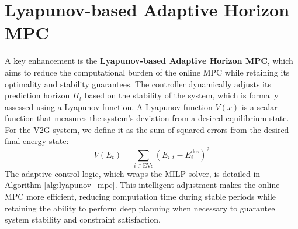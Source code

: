 \section{Lyapunov-based Adaptive Horizon MPC}

A key enhancement is the \textbf{Lyapunov-based Adaptive Horizon MPC}, which aims to reduce the computational burden of the online MPC while retaining its optimality and stability guarantees. The controller dynamically adjusts its prediction horizon $H_t$ based on the stability of the system, which is formally assessed using a Lyapunov function. A Lyapunov function $V(x)$ is a scalar function that measures the system's deviation from a desired equilibrium state. For the V2G system, we define it as the sum of squared errors from the desired final energy state:
\begin{equation}
    V(E_t) = \sum_{i \in \text{EVs}} (E_{i,t} - E_i^{\text{des}})^2
\end{equation}
The adaptive control logic, which wraps the MILP solver, is detailed in Algorithm \ref{alg:lyapunov_mpc}. This intelligent adjustment makes the online MPC more efficient, reducing computation time during stable periods while retaining the ability to perform deep planning when necessary to guarantee system stability and constraint satisfaction.

